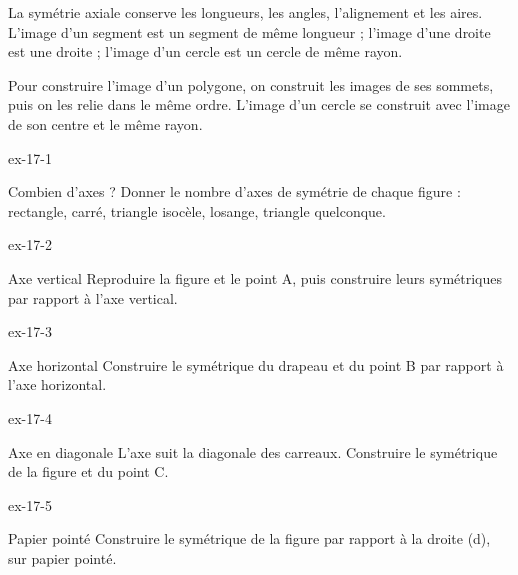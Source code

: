 \begin{propriete}La symétrie axiale conserve les longueurs, les angles, l’alignement et les aires. L’image d’un segment est un segment de même longueur ; l’image d’une droite est une droite ; l’image d’un cercle est un cercle de même rayon.\end{propriete}
\begin{savoirfaire}Pour construire l’image d’un polygone, on construit les images de ses sommets, puis on les relie dans le même ordre. L’image d’un cercle se construit avec l’image de son centre et le même rayon.\end{savoirfaire}

\clearpage{}
\begin{blocLivre}{ex-17-1}\begin{exercice}[1]{Combien d’axes ?}
Donner le nombre d’axes de symétrie de chaque figure : rectangle, carré, triangle isocèle, losange, triangle quelconque.
\label{fig-ex-17-1}
\end{exercice}\end{blocLivre}
\begin{blocLivre}{ex-17-2}\begin{exercice}[1]{Axe vertical}
Reproduire la figure et le point A, puis construire leurs symétriques par rapport à l’axe vertical.
\label{fig-ex-17-2}
\end{exercice}\end{blocLivre}
\begin{blocLivre}{ex-17-3}\begin{exercice}[1]{Axe horizontal}
Construire le symétrique du drapeau et du point B par rapport à l’axe horizontal.
\label{fig-ex-17-3}
\end{exercice}\end{blocLivre}
\begin{blocLivre}{ex-17-4}\begin{exercice}[1]{Axe en diagonale}
L’axe suit la diagonale des carreaux. Construire le symétrique de la figure et du point C.
\label{fig-ex-17-4}
\end{exercice}\end{blocLivre}
\begin{blocLivre}{ex-17-5}\begin{exercice}[1]{Papier pointé}
Construire le symétrique de la figure par rapport à la droite (d), sur papier pointé.
\label{fig-ex-17-5}
\end{exercice}\end{blocLivre}

